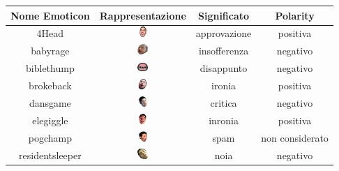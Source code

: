 \documentclass[a4paper,12pt,openright,twoside]{report}
\theoremstyle{definition}
\begin{document}
\begin{table}[H]
\begin{center}
\begin{tabular}{|c|c|c|c|}
\hline
Nome Emoticon & Rappresentazione & Significato & Polarity \\
\hline
\hline
4Head & \includegraphics[height=0.4cm, width=0.4cm]{Immagini/Emoticons/4head.png} & approvazione & positiva \\
\hline
babyrage & \includegraphics[height=0.4cm, width=0.4cm]{Immagini/Emoticons/babyrage.png} & insofferenza & negativo \\
\hline
biblethump & \includegraphics[height=0.4cm, width=0.4cm]{Immagini/Emoticons/biblethump.png} & disappunto & negativo \\
\hline
brokeback & \includegraphics[height=0.4cm, width=0.4cm]{Immagini/Emoticons/brokeback.png} & ironia & positiva \\
\hline
dansgame &  \includegraphics[height=0.4cm, width=0.4cm]{Immagini/Emoticons/dansgame.png} & critica & negativo \\
\hline
elegiggle & \includegraphics[height=0.4cm, width=0.4cm]{Immagini/Emoticons/elegiggle.png} & inronia & positiva \\
\hline
pogchamp & \includegraphics[height=0.4cm, width=0.4cm]{Immagini/Emoticons/pogchamp.png} & spam & non considerato \\
\hline
residentsleeper & \includegraphics[height=0.4cm, width=0.4cm]{Immagini/Emoticons/residentsleeper.png} & noia & negativo \\

\end{tabular}
\end{center}
\end{table}
\end{document}
